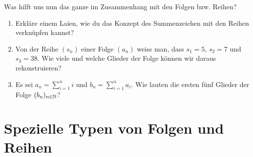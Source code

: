 \documentclass[11pt,oneside]{article}
\begin{document}
	Was hilft uns nun das ganze im Zusammenhang mit den Folgen bzw. Reihen?
	\begin{aufgabe}
		\begin{enumerate}
			\item Erkläre einem Laien, wie du das Konzept des Summenzeichen mit den Reihen verknüpfen kannst?
		\end{enumerate}
		\begin{enumerate}\setcounter{enumi}{1}
			\item Von der Reihe $(s_n)$ einer Folge $(a_n)$ weiss man, dass $s_1=5$, $s_2=7$ und $s_3=38$. Wie viele und welche Glieder der Folge können wir daraus rekonstruieren?
		\end{enumerate}
		\begin{enumerate}\setcounter{enumi}{2}
			\item Es sei $\displaystyle a_n=\sum_{i=1}^n i$ und $\displaystyle b_n=\sum_{i=1}^n a_i$. Wie lauten die ersten fünf Glieder der Folge $(b_n)_{n\in\mathbb{N}}$?
		\end{enumerate}
	\end{aufgabe}\newpage


\section{Spezielle Typen von Folgen und Reihen}
\end{document}
